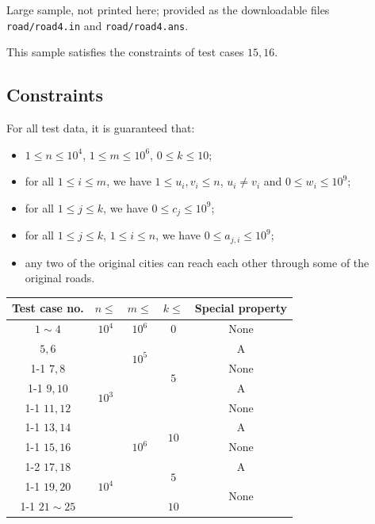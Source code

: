 \documentclass[11pt]{article}
\begin{document}
Large sample, not printed here;
provided as the downloadable files \texttt{road/road4.in} and \texttt{road/road4.ans}.

This sample satisfies the constraints of test cases $15, 16$.

\subsection*{Constraints}

For all test data, it is guaranteed that:
\begin{itemize}
\item $1 \le n \le 10^4$, $1 \le m \le 10^6$, $0 \le k \le 10$;
\item for all $1 \le i \le m$, we have $1 \le u_i, v_i \le n$, $u_i \ne v_i$
  and $0 \le w_i \le 10^9$;
\item for all $1 \le j \le k$, we have $0 \le c_j \le 10^9$;
\item for all $1 \le j \le k$, $1 \le i \le n$, we have
  $0 \le a_{j,i} \le 10^9$;
\item any two of the original cities can reach each other through some of
  the original roads.
\end{itemize}

\begin{center}
\begin{tabular}{|c|c|c|c|c|}
\hline
Test case no. & $n \le$ & $m \le$ & $k \le$ & Special property \\
\hline
$1 \sim 4$ & $10^4$ & $10^6$ & $0$ & None \\
\hline
$5, 6$ & \multirow{6}{*}{$10^3$} & \multirow{2}{*}{$10^5$}
  & \multirow{4}{*}{$5$} & A \\
\cline{1-1}\cline{5-5}
$7, 8$ & & & & None \\
\cline{1-1}\cline{3-3}\cline{5-5}
$9, 10$ & & \multirow{7}{*}{$10^6$} & & A \\
\cline{1-1}\cline{5-5}
$11, 12$ & & & & None \\
\cline{1-1}\cline{4-5}
$13, 14$ & & & \multirow{2}{*}{$10$} & A \\
\cline{1-1}\cline{5-5}
$15, 16$ & & & & None \\
\cline{1-2}\cline{4-5}
$17, 18$ & \multirow{3}{*}{$10^4$} & & \multirow{2}{*}{$5$} & A \\
\cline{1-1}\cline{5-5}
$19, 20$ & & & & \multirow{2}{*}{None} \\
\cline{1-1}\cline{4-4}
$21 \sim 25$ & & & $10$ & \\
\hline
\end{tabular}
\end{center}
\end{document}
